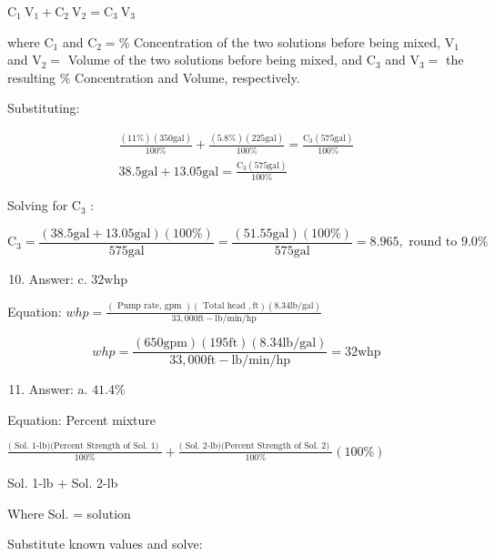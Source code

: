 \documentclass[10pt]{article}
\begin{document}
$\mathrm{C}_{1} \mathrm{~V}_{1}+\mathrm{C}_{2} \mathrm{~V}_{2}=\mathrm{C}_{3} \mathrm{~V}_{3}$

where $\mathrm{C}_{1}$ and $\mathrm{C}_{2}=\%$ Concentration of the two solutions before being mixed, $\mathrm{V}_{1}$ and $\mathrm{V}_{2}=$ Volume of the two solutions before being mixed, and $\mathrm{C}_{3}$ and $\mathrm{V}_{3}=$ the resulting $\%$ Concentration and Volume, respectively.

Substituting:

$$
\begin{array}{r}
\frac{(11 \%)(350 \mathrm{gal})}{100 \%}+\frac{(5.8 \%)(225 \mathrm{gal})}{100 \%}=\frac{\mathrm{C}_{3}(575 \mathrm{gal})}{100 \%} \\
38.5 \mathrm{gal}+13.05 \mathrm{gal}=\frac{\mathrm{C}_{3}(575 \mathrm{gal})}{100 \%}
\end{array}
$$

Solving for $\mathrm{C}_{3}$ :

$$
\mathrm{C}_{3}=\frac{(38.5 \mathrm{gal}+13.05 \mathrm{gal})(100 \%)}{575 \mathrm{gal}}=\frac{(51.55 \mathrm{gal})(100 \%)}{575 \mathrm{gal}}=8.965, \text { round to } 9.0 \%
$$

\begin{enumerate}
  \setcounter{enumi}{9}
  \item Answer: c. $32 \mathrm{whp}$
\end{enumerate}

Equation: $w h p=\frac{(\text { Pump rate, gpm })(\text { Total head }, \mathrm{ft})(8.34 \mathrm{lb} / \mathrm{gal})}{33,000 \mathrm{ft}-\mathrm{lb} / \mathrm{min} / \mathrm{hp}}$

$$
w h p=\frac{(650 \mathrm{gpm})(195 \mathrm{ft})(8.34 \mathrm{lb} / \mathrm{gal})}{33,000 \mathrm{ft}-\mathrm{lb} / \mathrm{min} / \mathrm{hp}}=32 \mathrm{whp}
$$

\begin{enumerate}
  \setcounter{enumi}{10}
  \item Answer: a. $41.4 \%$
\end{enumerate}

Equation: Percent mixture

$\frac{(\text { Sol. 1-lb)(Percent Strength of Sol. 1) }}{100 \%}+\frac{(\text { Sol. 2-lb)(Percent Strength of Sol. 2) }}{100 \%}(100 \%)$

Sol. 1-lb + Sol. 2-lb

Where Sol. = solution

Substitute known values and solve:
\end{document}
